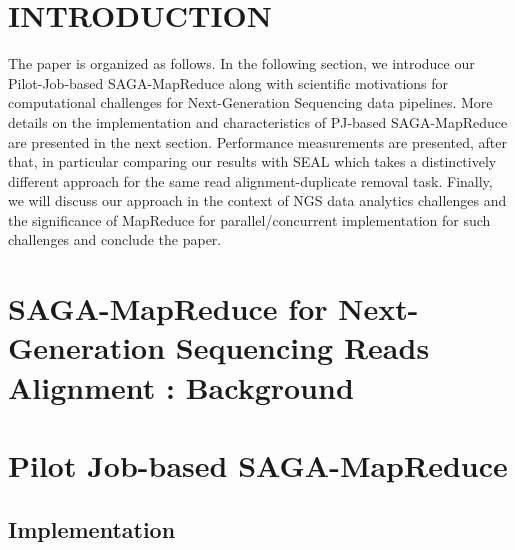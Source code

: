 \documentclass{sig-alternate}
\begin{document}



\section{INTRODUCTION} 


The paper is organized as follows. In the following section, we introduce our Pilot-Job-based SAGA-MapReduce along with scientific motivations for computational challenges for Next-Generation Sequencing data pipelines.  More details on the implementation and characteristics of PJ-based SAGA-MapReduce are presented in the next section.  Performance measurements are presented, after that, in particular comparing our results with SEAL which takes a distinctively different approach for the same read alignment-duplicate removal task.  Finally, we will discuss our approach in the context of NGS data analytics challenges and the significance of MapReduce for parallel/concurrent implementation for such challenges and conclude the paper.


\section{SAGA-MapReduce for Next-Generation Sequencing Reads Alignment : Background}




\section{Pilot Job-based SAGA-MapReduce}

\subsection{Implementation}
\end{document}
